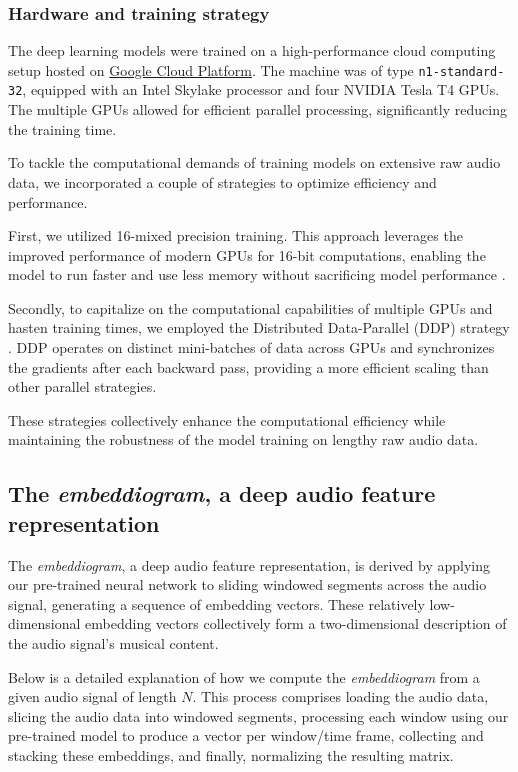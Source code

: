 \subsubsection{Hardware and training strategy}

The deep learning models were trained on a high-performance cloud computing setup hosted on \href{https://cloud.google.com/}{Google Cloud Platform}. The machine was of type \texttt{n1-standard-32}, equipped with an Intel Skylake processor and four NVIDIA Tesla T4 GPUs. The multiple GPUs allowed for efficient parallel processing, significantly reducing the training time.

To tackle the computational demands of training models on extensive raw audio data, we incorporated a couple of strategies to optimize efficiency and performance. 

First, we utilized 16-mixed precision training. This approach leverages the improved performance of modern GPUs for 16-bit computations, enabling the model to run faster and use less memory without sacrificing model performance \cite{Das2018MixedOperations}.

Secondly, to capitalize on the computational capabilities of multiple GPUs and hasten training times, we employed the Distributed Data-Parallel (DDP) strategy \cite{Li2020PyTorchTraining}. DDP operates on distinct mini-batches of data across GPUs and synchronizes the gradients after each backward pass, providing a more efficient scaling than other parallel strategies. 

These strategies collectively enhance the computational efficiency while maintaining the robustness of the model training on lengthy raw audio data.

\subsection{The \textit{embeddiogram}, a deep audio feature representation}

The \textit{embeddiogram}, a deep audio feature representation, is derived by applying our pre-trained neural network to sliding windowed segments across the audio signal, generating a sequence of embedding vectors. These relatively low-dimensional embedding vectors collectively form a two-dimensional description of the audio signal's musical content.

Below is a detailed explanation of how we compute the \textit{embeddiogram} from a given audio signal of length $N$. This process comprises loading the audio data, slicing the audio data into windowed segments, processing each window using our pre-trained model to produce a vector per window/time frame, collecting and stacking these embeddings, and finally, normalizing the resulting matrix. 

